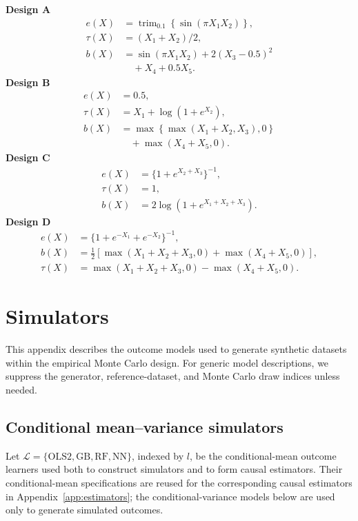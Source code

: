 \noindent\textbf{Design A}
\[
\begin{aligned}
e(X)&=\operatorname{trim}_{0.1}\!\left\{\sin(\pi X_1X_2)\right\},\\
\tau(X)&=(X_1+X_2)/2,\\
b(X)&=\sin(\pi X_1X_2)+2(X_3-0.5)^2\\
&\quad+X_4+0.5X_5.
\end{aligned}
\]
\noindent\textbf{Design B}
\[
\begin{aligned}
e(X)&=0.5,\\
\tau(X)&=X_1+\log(1+e^{X_2}),\\
b(X)&=\max\!\left\{\max(X_1+X_2,X_3),0\right\}\\
&\quad+\max(X_4+X_5,0).
\end{aligned}
\]
\noindent\textbf{Design C}
\[
\begin{aligned}
e(X)&=\{1+e^{X_2+X_3}\}^{-1},\\
\tau(X)&=1,\\
b(X)&=2\log\!\left(1+e^{X_1+X_2+X_3}\right).
\end{aligned}
\]
\noindent\textbf{Design D}
\[
\begin{aligned}
e(X)&=\{1+e^{-X_1}+e^{-X_2}\}^{-1},\\
b(X)&=\tfrac12\left[\max(X_1+X_2+X_3,0)+\max(X_4+X_5,0)\right],\\
\tau(X)&=\max(X_1+X_2+X_3,0)-\max(X_4+X_5,0).
\end{aligned}
\]

\clearpage
\section{Simulators}
\label{app:simulators}

This appendix describes the outcome models used to generate synthetic datasets within the empirical Monte Carlo design.
For generic model descriptions, we suppress the generator, reference-dataset, and Monte Carlo draw indices unless needed.

\subsection{Conditional mean--variance simulators}

Let \(\mathcal L=\{\mathrm{OLS2},\mathrm{GB},\mathrm{RF},\mathrm{NN}\}\), indexed by \(l\), be the conditional-mean outcome learners used both to construct simulators and to form causal estimators. Their conditional-mean specifications are reused for the corresponding causal estimators in Appendix~\ref{app:estimators}; the conditional-variance models below are used only to generate simulated outcomes.

